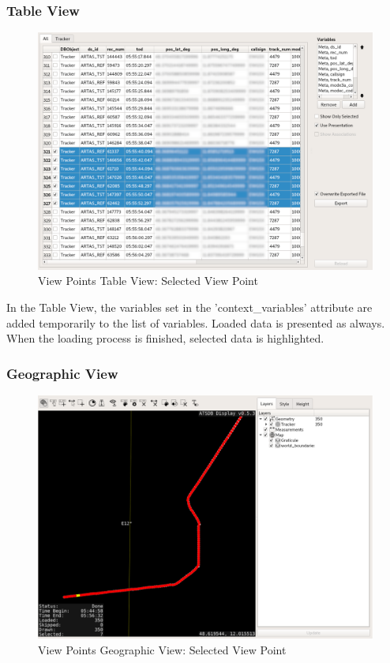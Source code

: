 \subsubsection{Table View} 

\begin{figure}[H]
    \hspace*{-2cm}
    \includegraphics[width=18cm,frame]{figures/view_points_tableview_selected.png}
  \caption{View Points Table View: Selected View Point}
\end{figure}

In the Table View, the variables set in the 'context\_variables' attribute are added temporarily to the list of variables. Loaded data is presented as always. When the loading process is finished, selected data is highlighted.

\subsubsection{Geographic View}

\begin{figure}[H]
    \hspace*{-2cm}
    \includegraphics[width=18cm,frame]{figures/view_points_geoview_selected.png}
  \caption{View Points Geographic View: Selected View Point}
\end{figure}

